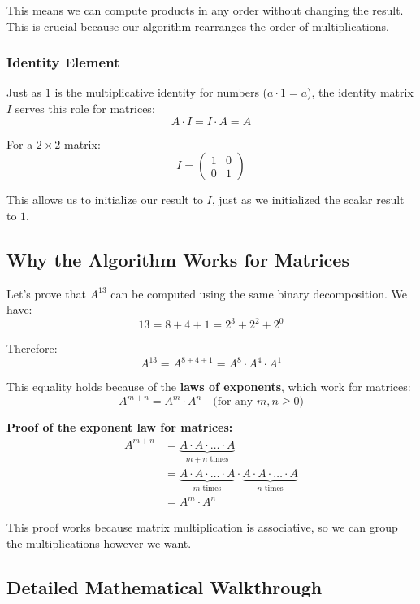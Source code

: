 \documentclass{article}
\begin{document}
	This means we can compute products in any order without changing the result. This is crucial because our algorithm rearranges the order of multiplications.
	
	\subsubsection{Identity Element}
	
	Just as $1$ is the multiplicative identity for numbers ($a \cdot 1 = a$), the identity matrix $I$ serves this role for matrices:
	\[
	A \cdot I = I \cdot A = A
	\]
	
	For a $2 \times 2$ matrix:
	\[
	I = \begin{pmatrix} 1 & 0 \\ 0 & 1 \end{pmatrix}
	\]
	
	This allows us to initialize our result to $I$, just as we initialized the scalar result to $1$.
	
	\subsection{Why the Algorithm Works for Matrices}
	
	Let's prove that $A^{13}$ can be computed using the same binary decomposition. We have:
	\[
	13 = 8 + 4 + 1 = 2^3 + 2^2 + 2^0
	\]
	
	Therefore:
	\[
	A^{13} = A^{8+4+1} = A^8 \cdot A^4 \cdot A^1
	\]
	
	This equality holds because of the \textbf{laws of exponents}, which work for matrices:
	\[
	A^{m+n} = A^m \cdot A^n \quad \text{(for any } m, n \geq 0\text{)}
	\]
	
	\textbf{Proof of the exponent law for matrices:}
	\begin{align*}
		A^{m+n} &= \underbrace{A \cdot A \cdot \ldots \cdot A}_{m+n \text{ times}} \\
		&= \underbrace{A \cdot A \cdot \ldots \cdot A}_{m \text{ times}} \cdot \underbrace{A \cdot A \cdot \ldots \cdot A}_{n \text{ times}} \\
		&= A^m \cdot A^n
	\end{align*}
	
	This proof works because matrix multiplication is associative, so we can group the multiplications however we want.
	
	\subsection{Detailed Mathematical Walkthrough}
	
\end{document}
